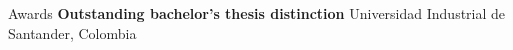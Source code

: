 \begin{rubric}{Awards}
\textbf{Outstanding bachelor's thesis distinction} \newline
Universidad Industrial de Santander, Colombia
\end{rubric}